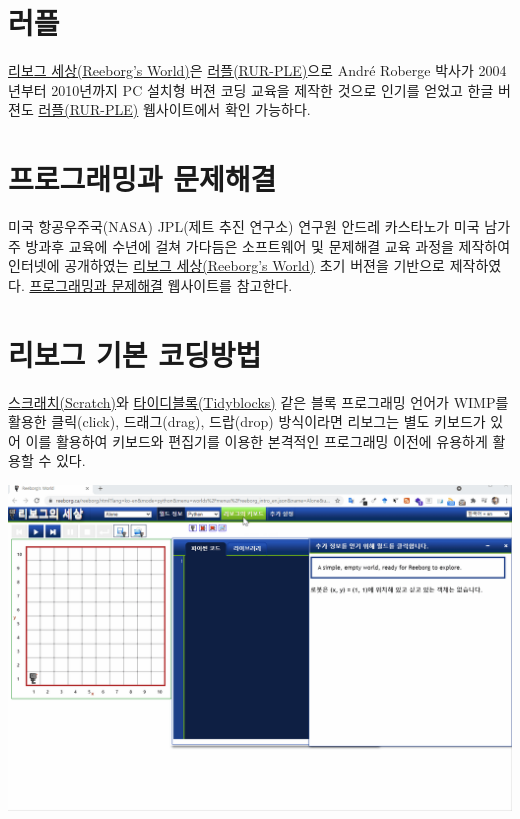 \documentclass[
  b5paperpaper,
  DIV=11,
  numbers=noendperiod]{scrreprt}
\begin{document}
\hypertarget{rur-ple}{%
\section*{러플}\label{rur-ple}}


\href{https://reeborg.ca/}{리보그 세상(Reeborg's World)}은
\href{https://statkclee.github.io/rur-ple/}{러플(RUR-PLE)}으로 André
Roberge 박사가 2004년부터 2010년까지 PC 설치형 버젼 코딩 교육을 제작한
것으로 인기를 얻었고 한글 버젼도
\href{https://statkclee.github.io/rur-ple/}{러플(RUR-PLE)} 웹사이트에서
확인 가능하다.

\hypertarget{code-persepctive}{%
\section*{프로그래밍과 문제해결}\label{code-persepctive}}


미국 항공우주국(NASA) JPL(제트 추진 연구소) 연구원 안드레 카스타노가
미국 남가주 방과후 교육에 수년에 걸쳐 가다듬은 소프트웨어 및 문제해결
교육 과정을 제작하여 인터넷에 공개하였는
\href{https://reeborg.ca/}{리보그 세상(Reeborg's World)} 초기 버젼을
기반으로 제작하였다.
\href{https://statkclee.github.io/code-perspectives/}{프로그래밍과
문제해결} 웹사이트를 참고한다.

\hypertarget{reeborg-programming}{%
\section*{리보그 기본 코딩방법}\label{reeborg-programming}}


\href{https://scratch.mit.edu/}{스크래치(Scratch)}와
\href{https://tidyblocks.tech/}{타이디블록(Tidyblocks)} 같은 블록
프로그래밍 언어가 WIMP를 활용한 클릭(click), 드래그(drag), 드랍(drop)
방식이라면 리보그는 별도 키보드가 있어 이를 활용하여 키보드와 편집기를
이용한 본격적인 프로그래밍 이전에 유용하게 활용할 수 있다.

\includegraphics[width=6.84375in,height=\textheight]{./fig/reeborg_howto.gif}
\end{document}
